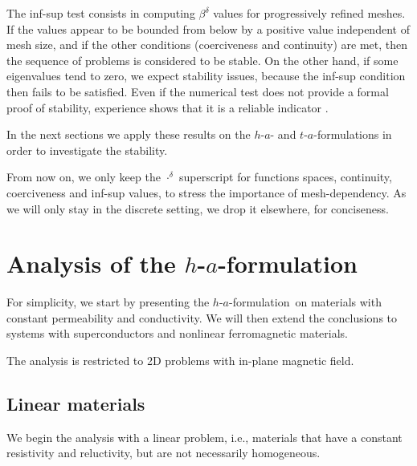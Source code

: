 \documentclass[journal]{IEEEtran}
\newcommand{\haf}{$h$-$a$-formulation\ }
\begin{document}
The inf-sup test consists in computing $\beta^\delta$ values for progressively refined meshes. If the values appear to be bounded from below by a positive value independent of mesh size, and if the other conditions (coerciveness and continuity) are met, then the sequence of problems is considered to be stable. On the other hand, if some eigenvalues tend to zero, we expect stability issues, because the inf-sup condition then fails to be satisfied. Even if the numerical test does not provide a formal proof of stability, experience shows that it is a reliable indicator \cite{chapelle1993inf,bathe2001inf}.

In the next sections we apply these results on the $h$-$a$- and $t$-$a$-formulations in order to investigate the stability.

From now on, we only keep the $\cdot^\delta$ superscript for functions spaces, continuity, coerciveness and inf-sup values, to stress the importance of mesh-dependency. As we will only stay in the discrete setting, we drop it elsewhere, for conciseness.

\section{Analysis of the \haf}\label{sec_haf}

For simplicity, we start by presenting the \haf on materials with constant permeability and conductivity. We will then extend the conclusions to systems with superconductors and nonlinear ferromagnetic materials.

The analysis is restricted to 2D problems with in-plane magnetic field.

\subsection{Linear materials}

We begin the analysis with a linear problem, i.e., materials that have a constant resistivity and reluctivity, but are not necessarily homogeneous.
\end{document}
